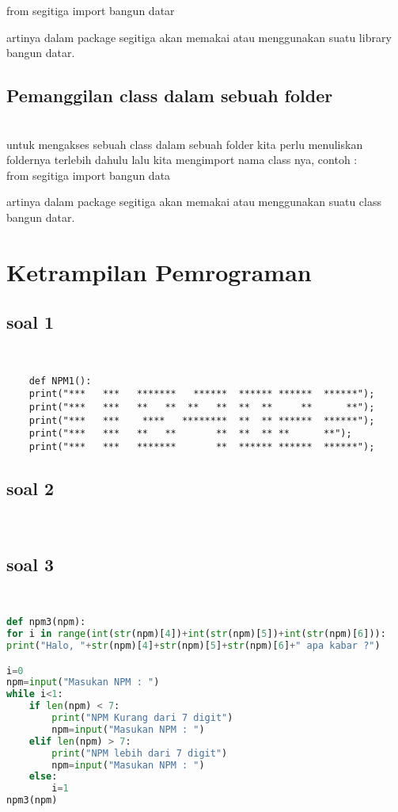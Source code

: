 from segitiga import bangun datar\\
			
\par artinya dalam package segitiga akan memakai atau menggunakan suatu library bangun datar.

	\section{Pemanggilan class dalam sebuah folder}\\
			untuk mengakses sebuah class dalam sebuah folder kita perlu menuliskan foldernya terlebih dahulu lalu kita  mengimport nama class nya, contoh :\\
			
from segitiga import bangun data\\
\par artinya dalam package segitiga akan memakai atau menggunakan suatu class bangun datar.
			
		

    \newpage			
	\chapter{Ketrampilan Pemrograman}
	\section*{soal 1}\\
\begin{lstlisting}
    def NPM1():
    print("***   ***   *******   ******  ****** ******  ******");
    print("***   ***   **   **  **   **  **  **     **      **");
    print("***   ***    ****   ********  **  ** ******  ******");
    print("***   ***   **   **       **  **  ** **      **");
    print("***   ***   *******       **  ****** ******  ******");
\end{lstlisting}
    	\section*{soal 2}\\
    
    	\section*{soal 3}\\
    	\begin{lstlisting}[language=Python]
 def npm3(npm):
for i in range(int(str(npm)[4])+int(str(npm)[5])+int(str(npm)[6])):
print("Halo, "+str(npm)[4]+str(npm)[5]+str(npm)[6]+" apa kabar ?")

i=0
npm=input("Masukan NPM : ")
while i<1:
    if len(npm) < 7:
        print("NPM Kurang dari 7 digit")
        npm=input("Masukan NPM : ")
    elif len(npm) > 7:
        print("NPM lebih dari 7 digit")
        npm=input("Masukan NPM : ")
    else:
        i=1
npm3(npm)

    \end{lstlisting}
